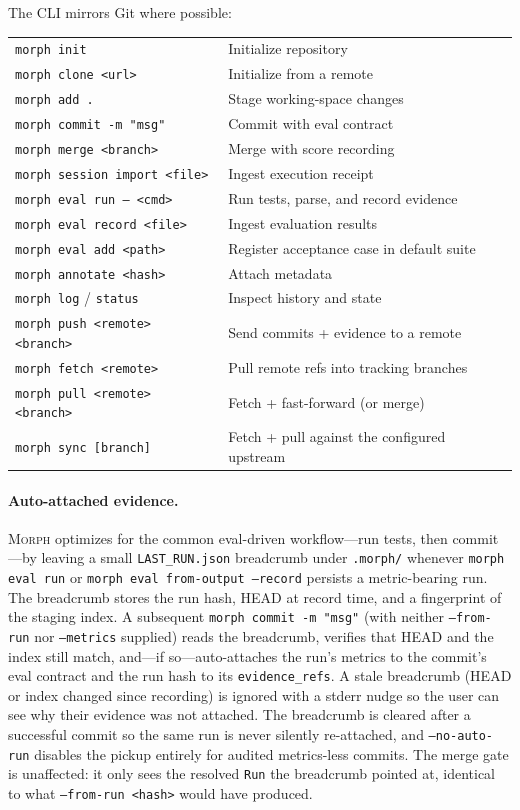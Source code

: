 \documentclass{article}
\begin{document}
The CLI mirrors Git where possible:

\smallskip
\begin{center}
\begin{tabular}{@{}ll@{}}
\texttt{morph init} & Initialize repository \\
\texttt{morph clone <url>} & Initialize from a remote \\
\texttt{morph add .} & Stage working-space changes \\
\texttt{morph commit -m "msg"} & Commit with eval contract \\
\texttt{morph merge <branch>} & Merge with score recording \\
\texttt{morph session import <file>} & Ingest execution receipt \\
\texttt{morph eval run -- <cmd>} & Run tests, parse, and record evidence \\
\texttt{morph eval record <file>} & Ingest evaluation results \\
\texttt{morph eval add <path>} & Register acceptance case in default suite \\
\texttt{morph annotate <hash>} & Attach metadata \\
\texttt{morph log} / \texttt{status} & Inspect history and state \\
\texttt{morph push <remote> <branch>} & Send commits + evidence to a remote \\
\texttt{morph fetch <remote>} & Pull remote refs into tracking branches \\
\texttt{morph pull <remote> <branch>} & Fetch + fast-forward (or merge) \\
\texttt{morph sync [branch]} & Fetch + pull against the configured upstream \\
\end{tabular}
\end{center}

\paragraph{Auto-attached evidence.}
\textsc{Morph} optimizes for the common eval-driven workflow---run tests, then
commit---by leaving a small \texttt{LAST\_RUN.json} breadcrumb under
\texttt{.morph/} whenever \texttt{morph eval run} or
\texttt{morph eval from-output --record} persists a metric-bearing run. The
breadcrumb stores the run hash, HEAD at record time, and a fingerprint of the
staging index. A subsequent \texttt{morph commit -m "msg"} (with neither
\texttt{--from-run} nor \texttt{--metrics} supplied) reads the breadcrumb,
verifies that HEAD and the index still match, and---if so---auto-attaches the
run's metrics to the commit's eval contract and the run hash to its
\texttt{evidence\_refs}. A stale breadcrumb (HEAD or index changed since
recording) is ignored with a stderr nudge so the user can see why their
evidence was not attached. The breadcrumb is cleared after a successful commit
so the same run is never silently re-attached, and \texttt{--no-auto-run}
disables the pickup entirely for audited metrics-less commits. The merge gate
is unaffected: it only sees the resolved \texttt{Run} the breadcrumb pointed
at, identical to what \texttt{--from-run <hash>} would have produced.
\end{document}
